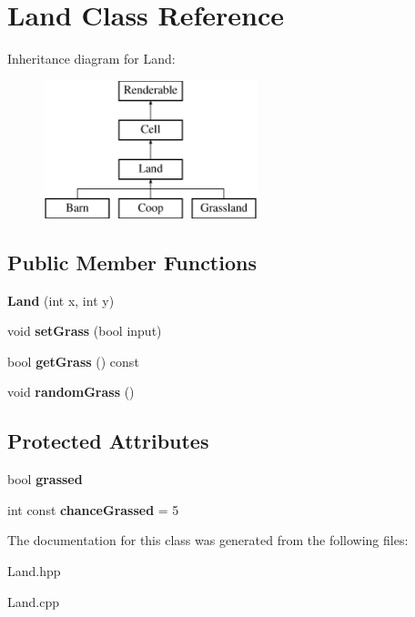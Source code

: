 \hypertarget{class_land}{}\section{Land Class Reference}
\label{class_land}
Inheritance diagram for Land\+:\begin{figure}[H]
\begin{center}
\leavevmode
\includegraphics[height=4.000000cm]{class_land}
\end{center}
\end{figure}
\subsection*{Public Member Functions}
\begin{DoxyCompactItemize}
\item 
\mbox{\label{class_land_a59f27f338cdbab6d7816ed26c1bf11d5}} 
{\bfseries Land} (int x, int y)
\item 
\mbox{\label{class_land_a87db2308a5bc6e9d95905db6d041483b}} 
void {\bfseries set\+Grass} (bool input)
\item 
\mbox{\label{class_land_ac406e3943c569a8b21263825d68edb31}} 
bool {\bfseries get\+Grass} () const
\item 
\mbox{\label{class_land_a6657c5bf928092c71de132caeac88f39}} 
void {\bfseries random\+Grass} ()
\end{DoxyCompactItemize}
\subsection*{Protected Attributes}
\begin{DoxyCompactItemize}
\item 
\mbox{\label{class_land_ad9ab8673faf16debea9650bac6565737}} 
bool {\bfseries grassed}
\item 
\mbox{\label{class_land_a3d92adb366b02577731c9eb463a0b8fe}} 
int const {\bfseries chance\+Grassed} = 5
\end{DoxyCompactItemize}


The documentation for this class was generated from the following files\+:\begin{DoxyCompactItemize}
\item 
Land.\+hpp\item 
Land.\+cpp\end{DoxyCompactItemize}
